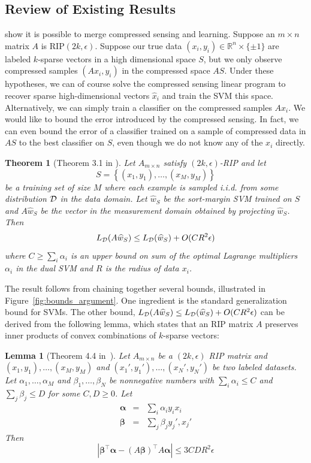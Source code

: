 \documentclass[english]{article}
\theoremstyle{plain}
\newtheorem{theorem}{Theorem}
\newtheorem{lemma}{Lemma}
\begin{document}
\subsection{Review of Existing Results}
\citet{Calderbank09} show it is possible to merge compressed sensing and learning.
Suppose an $m \times n$ matrix $A$ is $\mbox{RIP}(2k,\epsilon)$.
Suppose our true data $(x_i, y_i) \in \mathbb{R}^n \times \{\pm 1\}$ are labeled $k$-sparse vectors in a high dimensional space $S$, but we only observe compressed samples $(Ax_i,y_i)$ in the compressed space $AS$.
Under these hypotheses, we can of course solve the compressed sensing linear program to recover sparse high-dimensional vectors $\widehat{x}_i$ and train the SVM this space.
Alternatively, we can simply train a classifier on the compressed samples $Ax_i$.
We would like to bound the error introduced by the compressed sensing.
In fact, we can even bound the error of a classifier trained on a sample of compressed data in $AS$ to the best classifier on $S$, even though we do not know any of the $x_i$ directly.
\begin{theorem}[Theorem 3.1 in \citet{Calderbank09}]
\label{theorem:alog} Let $A_{m\times n}$ satisfy $(2k,\epsilon)$-RIP
and let
\[
S=\left\{ (x_{1},y_{1}),\ldots,(x_{M},y_{M})\right\} 
\]
be a training set of size $M$ where each example is sampled i.i.d.
from some distribution ${\cal D}$ in the data domain. Let $\widehat{w}_{S}$
be the sort-margin SVM trained on $S$ and $A\widehat{w}_{S}$ be
the vector in the measurement domain obtained by projecting $\widehat{w}_{S}$.
Then
\[
L_{{\cal D}}(A\widehat{w}_{S})\leq L_{{\cal D}}(\widehat{w}_{S})+O(CR^{2}\epsilon)
\]
where $C\geq\sum_{i}\alpha_{i}$ is an upper bound on sum of the optimal
Lagrange multipliers $\alpha_{i}$ in the dual SVM and $R$ is the
radius of data $x_{i}$.
\end{theorem}

The result follows from chaining together several bounds, illustrated in Figure~\ref{fig:bounds_argument}. One ingredient is the standard generalization bound for SVMs.
The other bound, $L_{\cal D}(A\widehat{w}_S) \leq L_{\cal D}(\widehat{w}_S) + O(CR^2\epsilon)$ can be derived from the following lemma, which states that an RIP matrix $A$ preserves inner products of convex combinations of $k$-sparse vectors:

\begin{lemma}[Theorem 4.4 in~\citet{Calderbank09}]
\label{lemma:their-theorem-44}Let $A_{m\times n}$ be a $(2k,\epsilon)$
RIP matrix and $(x_1,y_1), \ldots, (x_M,y_M)$ and $(x_1',y_1'), \ldots, (x_N',y_N')$ be two labeled datasets. Let $\alpha_1, \ldots, \alpha_M$ and $\beta_1, \ldots, \beta_N$ be nonnegative numbers with $\sum_i \alpha_i \leq C$ and $\sum_j \beta_j \leq D$ for some $C, D \geq 0$. Let
\begin{eqnarray*}
\bm{\alpha} & = & \sum_{i}\alpha_iy_ix_i \\
\bm{\beta} & = & \sum_{j}\beta_j y_j',x_j'
\end{eqnarray*}
Then
\[
\left|\bm{\beta}^{\top}\bm{\alpha}-\left(A\bm{\beta}\right)^{\top}A\bm{\alpha}\right|\leq3CDR^{2}\epsilon
\]
\end{lemma}
\end{document}
